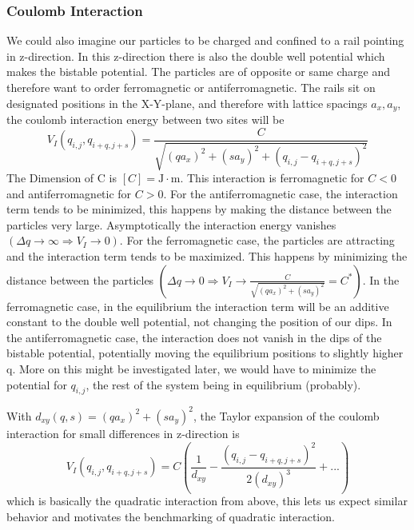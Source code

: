 	\subsubsection{Coulomb Interaction}
	We could also imagine our particles to be charged and confined to a rail pointing in z-direction. In this z-direction there is also the double well potential which makes the bistable potential. The particles are of opposite or same charge and therefore want to order ferromagnetic or antiferromagnetic. The rails sit on designated positions in the X-Y-plane, and therefore with lattice spacings $a_x, a_y$, the coulomb interaction energy between two sites will be
	\begin{equation}
		V_I (q_{i,j}, q_{i+q, j+s}) =	\frac{C}{\sqrt{(q a_x)^2 + (s a_y)^2 + (q_{i, j} - q_{i+q, j+s})^2}}
	\end{equation}
	The Dimension of C is $[C] = \text{J} \cdot \text{m}$.
	This interaction is ferromagnetic for $C < 0$ and antiferromagnetic for $C > 0$. For the antiferromagnetic case, the interaction term tends to be minimized, this happens by making the distance between the particles very large. Asymptotically the interaction energy vanishes $\left(\Delta q \rightarrow \infty \Rightarrow V_I \rightarrow 0\right)$. For the ferromagnetic case, the particles are attracting and the interaction term tends to be maximized. This happens by minimizing the distance between the particles $\left(\Delta q \rightarrow 0 \Rightarrow V_I \rightarrow \frac{C}{\sqrt{(q a_x)^2 + (s a_y)^2}} =	C^*\right)$. In the ferromagnetic case, in the equilibrium the interaction term will be an additive constant to the double well potential, not changing the position of our dips. In the antiferromagnetic case, the interaction does not vanish in the dips of the bistable potential, potentially moving the equilibrium positions to slightly higher q. More on this might be investigated later, we would have to minimize the potential for $q_{i, j}$, the rest of the system being in equilibrium (probably).
	
	With $d_{xy}(q, s) =(q a_x)^2 + (s a_y)^2	$, the Taylor expansion of the coulomb interaction for small differences in z-direction is
	\begin{equation}
		V_I (q_{i,j}, q_{i+q, j+s}) =	C \left(\frac{1}{d_{xy}} - \frac{(q_{i,j}-q_{i+q, j+s})^2}{2 \left(d_{xy}\right)^{3}} + ... \right)
	\end{equation}
	which is basically the quadratic interaction from above, this lets us expect similar behavior and motivates the benchmarking of quadratic interaction.
	
